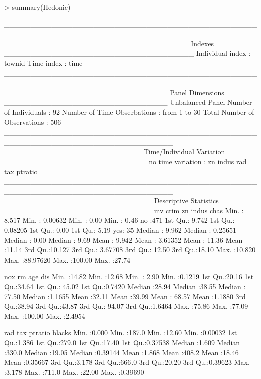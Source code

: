 \documentclass[a4paper]{article}
\begin{document}
\begin{Schunk}
\begin{Sinput}
> summary(Hedonic)
\end{Sinput}
\begin{Soutput}
________________________________________________________________________________ 
___________________________________ Indexes ____________________________________
Individual index : townid
Time index       : time
________________________________________________________________________________ 
_______________________________ Panel Dimensions _______________________________
Unbalanced Panel
Number of Individuals        :  92
Number of Time Obserbations  :  from 1 to 30
Total Number of Observations :  506
________________________________________________________________________________ 
__________________________ Time/Individual Variation ___________________________
no time variation   :  zn indus rad tax ptratio 
________________________________________________________________________________ 
____________________________ Descriptive Statistics ____________________________
       mv              crim                zn             indus        chas    
 Min.   : 8.517   Min.   : 0.00632   Min.   :  0.00   Min.   : 0.46   no :471  
 1st Qu.: 9.742   1st Qu.: 0.08205   1st Qu.:  0.00   1st Qu.: 5.19   yes: 35  
 Median : 9.962   Median : 0.25651   Median :  0.00   Median : 9.69            
 Mean   : 9.942   Mean   : 3.61352   Mean   : 11.36   Mean   :11.14            
 3rd Qu.:10.127   3rd Qu.: 3.67708   3rd Qu.: 12.50   3rd Qu.:18.10            
 Max.   :10.820   Max.   :88.97620   Max.   :100.00   Max.   :27.74            
                                                                               
      nox              rm             age              dis        
 Min.   :14.82   Min.   :12.68   Min.   :  2.90   Min.   :0.1219  
 1st Qu.:20.16   1st Qu.:34.64   1st Qu.: 45.02   1st Qu.:0.7420  
 Median :28.94   Median :38.55   Median : 77.50   Median :1.1655  
 Mean   :32.11   Mean   :39.99   Mean   : 68.57   Mean   :1.1880  
 3rd Qu.:38.94   3rd Qu.:43.87   3rd Qu.: 94.07   3rd Qu.:1.6464  
 Max.   :75.86   Max.   :77.09   Max.   :100.00   Max.   :2.4954  
                                                                  
      rad             tax           ptratio          blacks       
 Min.   :0.000   Min.   :187.0   Min.   :12.60   Min.   :0.00032  
 1st Qu.:1.386   1st Qu.:279.0   1st Qu.:17.40   1st Qu.:0.37538  
 Median :1.609   Median :330.0   Median :19.05   Median :0.39144  
 Mean   :1.868   Mean   :408.2   Mean   :18.46   Mean   :0.35667  
 3rd Qu.:3.178   3rd Qu.:666.0   3rd Qu.:20.20   3rd Qu.:0.39623  
 Max.   :3.178   Max.   :711.0   Max.   :22.00   Max.   :0.39690  
                                                                  

\end{Soutput}
\end{Schunk}
\end{document}
